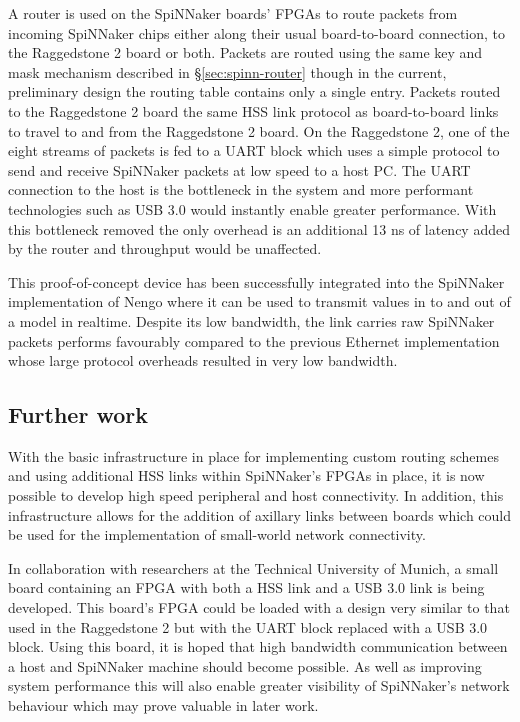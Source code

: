 				A router is used on the SpiNNaker boards' FPGAs to route packets from
				incoming SpiNNaker chips either along their usual board-to-board
				connection, to the Raggedstone 2 board or both.  Packets are routed
				using the same key and mask mechanism described in
				\S\ref{sec:spinn-router} though in the current, preliminary design the
				routing table contains only a single entry.  Packets routed to the
				Raggedstone 2 board the same HSS link protocol as board-to-board links
				to travel to and from the Raggedstone 2 board.  On the Raggedstone 2,
				one of the eight streams of packets is fed to a UART block which uses a
				simple protocol to send and receive SpiNNaker packets at low speed to a
				host PC. The UART connection to the host is the bottleneck in the system
				and more performant technologies such as USB 3.0 would instantly enable
				greater performance. With this bottleneck removed the only overhead is
				an additional 13 ns of latency added by the router and throughput would
				be unaffected.
				
				This proof-of-concept device has been successfully integrated into the
				SpiNNaker implementation of Nengo where it can be used to transmit
				values in to and out of a model in realtime. Despite its low bandwidth,
				the link carries raw SpiNNaker packets performs favourably compared to
				the previous Ethernet implementation whose large protocol overheads
				resulted in very low bandwidth.
			
			\subsection{Further work}
				
				
				With the basic infrastructure in place for implementing custom routing
				schemes and using additional HSS links within SpiNNaker's FPGAs in
				place, it is now possible to develop high speed peripheral and host
				connectivity. In addition, this infrastructure allows for the addition
				of axillary links between boards which could be used for the
				implementation of small-world network connectivity.
				
				In collaboration with researchers at the Technical University of Munich,
				a small board containing an FPGA with both a HSS link and a USB 3.0 link
				is being developed. This board's FPGA could be loaded with a design very
				similar to that used in the Raggedstone 2 but with the UART block
				replaced with a USB 3.0 block. Using this board, it is hoped that high
				bandwidth communication between a host and SpiNNaker machine should
				become possible. As well as improving system performance this will also
				enable greater visibility of SpiNNaker's network behaviour which may
				prove valuable in later work.

